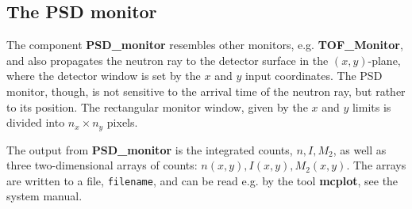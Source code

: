 
\subsection*{The PSD monitor}

The component \textbf{PSD\_monitor} resembles other monitors, e.g.
\textbf{TOF\_Monitor}, and also propagates the neutron ray to the detector
surface in the $(x,y)$-plane, where the detector window is set
by the $x$ and $y$ input coordinates.
The PSD monitor, though, is not sensitive to the arrival time
of the neutron ray, but rather to its position.
The rectangular monitor window, given by the $x$ and $y$
limits is divided into $n_x \times n_y$ pixels.

The output from \textbf{PSD\_monitor} is the integrated counts, $n, I, M_2$,
as well as
three two-dimensional arrays of counts: $n(x,y), I(x,y), M_2(x,y)$.
The arrays are written to a file, \verb+filename+, and can be read e.g. by the tool
\textbf{mcplot}, see the system manual.
